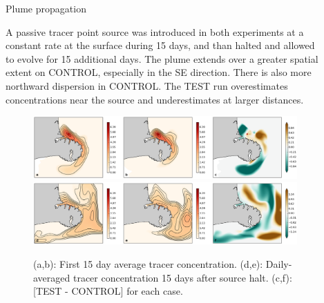 \documentclass[final]{beamer}
\newlength{\sepwid}
\newlength{\onecolwid}
\newlength{\twocolwid}
\begin{document}
\begin{frame}[t]
\begin{columns}[t]
\begin{column}{\twocolwid}


\end{column} %

\begin{column}{\sepwid}\end{column} %

\begin{column}{\onecolwid} %

    \begin{block}{Plume propagation}

    A passive tracer point source was introduced in both experiments at a constant rate at the surface during 15 days, and than halted and allowed to evolve for 15 additional days. The plume extends over a greater spatial extent on CONTROL, especially in the SE direction. There is also more northward dispersion in CONTROL. The TEST run overestimates concentrations near the source and underestimates at larger distances. 

    \begin{figure}
    \includegraphics[width=1.0\linewidth]{dye_concentration.png}\\
    \includegraphics[width=1.0\linewidth]{dye_concentration_last-day.png}
    \caption{\label{dye} (a,b): First 15 day average tracer concentration. (d,e): Daily-averaged tracer concentration 15 days after source halt. (c,f): [TEST - CONTROL] for each case. }
    \end{figure}

    \end{block}



\end{column}
\end{columns}
\end{frame}
\end{document}
